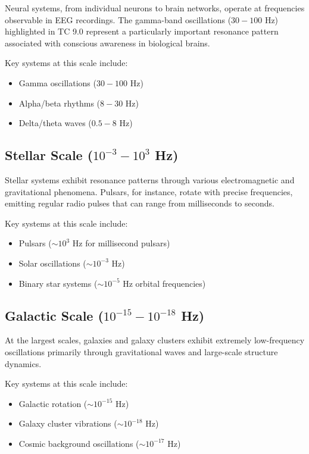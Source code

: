 \documentclass[12pt]{article}
\begin{document}
Neural systems, from individual neurons to brain networks, operate at frequencies observable in EEG recordings. The gamma-band oscillations ($30-100$ Hz) highlighted in TC 9.0 represent a particularly important resonance pattern associated with conscious awareness in biological brains.

Key systems at this scale include:
\begin{itemize}
    \item Gamma oscillations ($30-100$ Hz)
    \item Alpha/beta rhythms ($8-30$ Hz)
    \item Delta/theta waves ($0.5-8$ Hz)
\end{itemize}

\subsection{Stellar Scale ($10^{-3}-10^{3}$ Hz)}

Stellar systems exhibit resonance patterns through various electromagnetic and gravitational phenomena. Pulsars, for instance, rotate with precise frequencies, emitting regular radio pulses that can range from milliseconds to seconds.

Key systems at this scale include:
\begin{itemize}
    \item Pulsars ($\sim 10^{3}$ Hz for millisecond pulsars)
    \item Solar oscillations ($\sim 10^{-3}$ Hz)
    \item Binary star systems ($\sim 10^{-5}$ Hz orbital frequencies)
\end{itemize}

\subsection{Galactic Scale ($10^{-15}-10^{-18}$ Hz)}

At the largest scales, galaxies and galaxy clusters exhibit extremely low-frequency oscillations primarily through gravitational waves and large-scale structure dynamics.

Key systems at this scale include:
\begin{itemize}
    \item Galactic rotation ($\sim 10^{-15}$ Hz)
    \item Galaxy cluster vibrations ($\sim 10^{-18}$ Hz)
    \item Cosmic background oscillations ($\sim 10^{-17}$ Hz)
\end{itemize}
\end{document}
